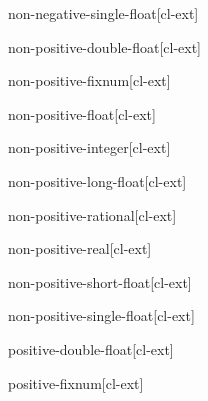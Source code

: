 \documentclass[10pt,english]{book}
\begin{document}
\begin{type}{non-negative-single-float}{}[cl-ext]
  
\end{type}

\begin{type}{non-positive-double-float}{}[cl-ext]
  
\end{type}

\begin{type}{non-positive-fixnum}{}[cl-ext]
  
\end{type}

\begin{type}{non-positive-float}{}[cl-ext]
  
\end{type}

\begin{type}{non-positive-integer}{}[cl-ext]
  
\end{type}

\begin{type}{non-positive-long-float}{}[cl-ext]
  
\end{type}

\begin{type}{non-positive-rational}{}[cl-ext]
  
\end{type}

\begin{type}{non-positive-real}{}[cl-ext]
  
\end{type}

\begin{type}{non-positive-short-float}{}[cl-ext]
  
\end{type}

\begin{type}{non-positive-single-float}{}[cl-ext]
  
\end{type}

\begin{type}{positive-double-float}{}[cl-ext]
  
\end{type}

\begin{type}{positive-fixnum}{}[cl-ext]
  
\end{type}
\end{document}
